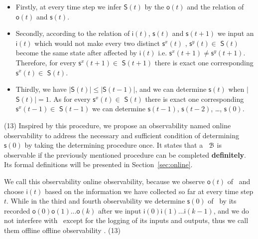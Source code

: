 \begin{itemize}
	\item  Firstly, at every time step we infer $\mathsf{S}(t)$ by the $\mathsf{o}(t)$ and the relation of $\mathsf{o}(t)$ and $\mathsf{s}(t)$.
	\item Secondly, according to the relation of $\mathsf{i}(t)$, $\mathsf{s}(t)$ and $\mathsf{s}(t+1)$ we input an $\mathsf{i}(t)$ which would not make every two distinct $\mathsf{s}^{x}(t)$ , $\mathsf{s}^{y}(t)$$\in$ $\mathsf{S}(t)$ become the same state after affected by $\mathsf{i}(t)$ i.e. $\mathsf{s}^{x}(t+1)\ne\mathsf{s}^{y}(t+1)$. Therefore, for every $\mathsf{s}^{x}(t+1)\in $ $\mathsf{S}(t+1)$ there is exact one corresponding $\mathsf{s}^{x}(t)\in $ $\mathsf{S}(t)$.
	\item Thirdly, we have $|$$\mathsf{S}(t)$$|\le|$$\mathsf{S}(t-1)$$|$, and we can determine $\mathsf{s}(t)$ when $|$$\mathsf{S}(t)$$|=1$. As for every $\mathsf{s}^{x}(t)\in $ $\mathsf{S}(t)$ there is exact one corresponding $\mathsf{s}^{x}(t-1)\in $ $\mathsf{S}(t-1)$ we can determine $\mathsf{s}(t-1)$, $\mathsf{s}(t-2)$, \ldots, $\mathsf{s}(0)$.
\end{itemize}



{\color{red} (13)} Inspired by this procedure, we propose an observability named online observability to address the necessary and sufficient condition of determining $\mathsf{s}(0)$ by taking the determining procedure once. It states that a \BCN\ ${\mathcal{B}}$ is observable if the previously mentioned procedure can be completed {\bf definitely}. Its formal definitions will be presented in Section~\ref{sec:online}. 

We call this observability online observability, because we observe $\mathsf{o}(t)$ of \BCN\ and choose $\mathsf{i}(t)$ based on the information we have collected so far at every time step $t$. While in the third and fourth observability we determine $\mathsf{s}(0)$ of \BCN\ by its recorded $\mathsf{o}(0)\mathsf{o}(1)\ldots\mathsf{o}(k)$ after we input $\mathsf{i}(0)\mathsf{i}(1)\ldots\mathsf{i}(k-1)$, and  we do not interfere with \BCN\ except for the logging of its inputs and outputs, thus we call them offline offline observability \cite{Cassar2017A}.{\color{red} (13)}


